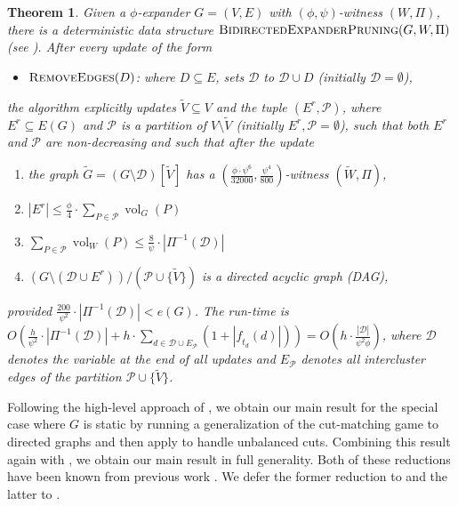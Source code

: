 \documentclass[11pt]{article}
\newtheorem{theorem}{Theorem}[section]
\newcommand\ff{\boldsymbol{\mathit{f}}}
\begin{document}
\begin{theorem}\label{thm:ExpanderPruning} Given a $\phi$-expander $G = (V, E)$ with $(\phi,\psi)$-witness $(W, \Pi)$, there is a deterministic data structure $\textsc{BidirectedExpanderPruning}(G, W, \Pi)$ (see ). After every update of the form
\begin{itemize}
    \item $\textsc{RemoveEdges}(D)$: where $D \subseteq E$, sets $\mathcal{D}$ to $\mathcal{D} \cup D$ (initially $\mathcal{D} = \emptyset$),
\end{itemize}
the algorithm explicitly updates $\tilde{V} \subseteq V$ and the tuple $(E^r, \mathcal{P})$, where $E^r \subseteq E(G)$ and $\mathcal{P}$ is a partition of $V \setminus \tilde{V}$ (initially $E^r , \mathcal{P} = \emptyset$), such that both $E^r$ and $\mathcal{P}$ are non-decreasing and such that after the update 
\begin{enumerate}
    \item \label{itm:DEP-thm1} the graph $\tilde{G} = \left(G \setminus \mathcal{D}\right)\left[\tilde{V} \right]$ has a $\left(\frac{\phi \cdot \psi^6}{32000}, \frac{\psi^4}{800}\right)$-witness $(\tilde{W}, \Pi)$,
    \item \label{itm:DEP-thm2} $|E^r| \leq \frac{\phi}{4} \cdot \sum_{P \in \mathcal{P}} \operatorname{vol}_{G}(P)$
    \item \label{itm:DEP-thm3} $\sum_{P \in \mathcal{P}} \operatorname{vol}_{W}(P) \leq \frac{8}{\psi} \cdot |\Pi^{-1}(\mathcal{D})|$
    \item \label{itm:DEP-thm4} $(G \setminus (\mathcal{D} \cup E^r))/ (\mathcal{P} \cup \{\tilde{V}\})$ is a directed acyclic graph (DAG),
\end{enumerate}
provided $\frac{200}{\psi^2} \cdot |\Pi^{-1}(\mathcal{D})| < e(G)$. The run-time is $O\left(\frac{h}{\psi^2} \cdot |\Pi^{-1}(\mathcal{D})| + h \cdot \sum_{d \in \mathcal{D} \cup E_{\mathcal{P}}} (1 + |\ff_{t_d}(d)|) \right) = O\left(h \cdot \frac{|\mathcal{D}|}{\psi^2 \phi} \right)$, where $\mathcal{D}$ denotes the variable at the end of all updates and $E_{\mathcal{P}}$ denotes all intercluster edges of the partition $\mathcal{P} \cup \{\tilde{V}\}$.
\end{theorem}

Following the high-level approach of \cite{saranurak2019expander}, we obtain our main result  for the special case where $G$ is static by running a generalization of the cut-matching game to directed graphs \cite{khandekar2009graph, louis2010cut} and then apply  to handle unbalanced cuts. Combining this result again with , we obtain our main result  in full generality. Both of these reductions have been known from previous work \cite{bernstein2020deterministic, hua2023maintaining}. We defer the former reduction to  and the latter to . 
\end{document}
